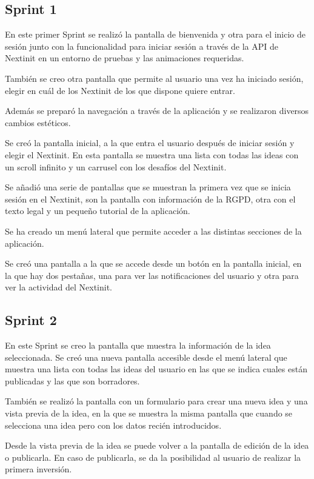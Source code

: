 \subsection{Sprint 1}

En este primer Sprint se realizó la pantalla de bienvenida y otra para el inicio de sesión junto 
con la funcionalidad para iniciar sesión a través de la API de Nextinit en un entorno de 
pruebas y las animaciones requeridas.

También se creo otra pantalla que permite al usuario una vez ha iniciado sesión,
elegir en cuál de los Nextinit de los que dispone quiere entrar.

Además se preparó la navegación a través de la aplicación y se realizaron diversos 
cambios estéticos.

Se creó la pantalla inicial, a la que entra el usuario después de iniciar sesión y elegir el 
Nextinit. En esta pantalla se muestra una lista con todas las ideas con un scroll infinito
y un carrusel con los desafíos del Nextinit.

Se añadió una serie de pantallas que se muestran la primera vez que se inicia sesión 
en el Nextinit, son la pantalla con información de la RGPD, otra con el texto legal y 
un pequeño tutorial de la aplicación.

Se ha creado un menú lateral que permite acceder a las distintas secciones de la 
aplicación.

Se creó una pantalla a la que se accede desde un botón en la pantalla inicial,
en la que hay dos pestañas, una para ver las notificaciones del usuario y otra para
ver la actividad del Nextinit.


\subsection{Sprint 2}

En este Sprint se creo la pantalla que muestra la información de la idea seleccionada. Se creó 
una nueva pantalla accesible desde el menú lateral que muestra una lista con todas las ideas 
del usuario en las que se indica cuales están publicadas y las que son borradores. 

También se realizó la pantalla con un formulario para crear una nueva idea y una vista previa 
de la idea, en la que se muestra la misma pantalla que cuando se selecciona una idea pero con 
los datos recién introducidos.

Desde la vista previa de la idea se puede volver a la pantalla de edición de la idea o publicarla. En 
caso de publicarla, se da la posibilidad al usuario de realizar la primera inversión.

